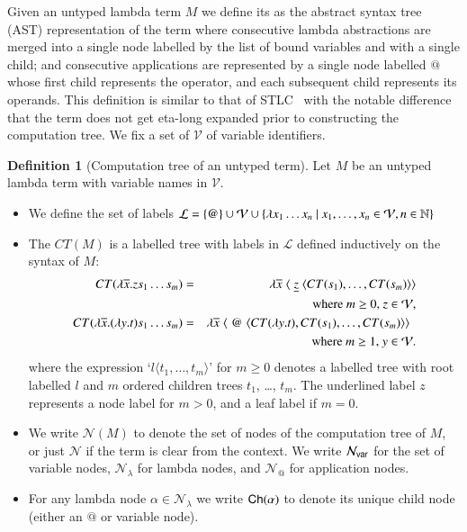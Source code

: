 \documentclass{elsarticle}
\makeatletter
\theoremstyle{plain}
\theoremstyle{definition}
\newtheorem{definition}{Definition}[section]
\theoremstyle{remark}
\newcommand\VarSet{\mathcal{V}}
\newcommand\Nodes{\mathcal{N}}%
\newcommand\NodesVar{\Nodes_{\sf var}}%
\newcommand\NodesLmd{\Nodes_\lambda}%
\newcommand\NodesApp{\Nodes_@}%
\newcommand{\child}{{\small \sf Ch}} %
\newcommand{\ctree}{CT} %
\makeatother
\begin{document}
Given an untyped lambda term $M$ we define its  as the abstract syntax tree (AST) representation of the term where consecutive lambda abstractions are merged into a single node labelled by the list of bound variables and with a single child; and consecutive applications are represented by a single node labelled $@$ whose first child represents the operator, and each subsequent child represents its operands.
This definition is similar to that of STLC~\cite{Ong2006, BlumPhd} with the notable difference that the term does not get eta-long expanded prior to constructing the computation tree.
We fix a set of $\VarSet$ of variable identifiers.
\begin{definition}[Computation tree of an untyped term]
Let $M$ be an untyped lambda term with variable names in $\VarSet$.
\begin{itemize}
\item We define the set of labels
$\mathcal{L} = \{ @ \} \union \VarSet \union \{ \lambda x_1 \ldots x_n \ | \ x_1 ,\ldots, x_n \in
    \VarSet, n\in\nat \}$
\item
    The  $\ctree(M)$ is a labelled tree with labels in $\mathcal{L}$
    defined inductively on the syntax of $M$:
    \begin{eqnarray*}
        \ctree(\lambda \overline{x} . z s_1 \ldots s_m) &=& \lambda \overline{x}\; \langle\; \underline z\; \langle \ctree(s_1),\ldots,\ctree(s_m)\rangle\rangle\\
        && \hbox {where $m\geq 0$, $z \in \VarSet$}, \\
 \ctree(\lambda \overline{x} . (\lambda y.t) s_1 \ldots s_m) &=& \lambda \overline{x}\; \langle\; @ \; \langle \ctree(\lambda y.t),\ctree(s_1),\ldots,\ctree(s_m) \rangle \rangle \enspace\\
&&  \hbox{where $m\geq 1$, $y\in \VarSet$}.
    \end{eqnarray*}
where the expression `$l\langle t_1, \ldots, t_m \rangle$' for $m \geq 0$ denotes a labelled tree with root labelled $l$ and $m$ ordered children trees $t_1$, \ldots, $t_m$. The underlined label $z$ represents a node label for $m>0$, and a leaf label if $m=0$.

\item We write $\Nodes(M)$ to denote the set of nodes of the computation tree of $M$, or just $\Nodes$ if the term is clear from the context. We write $\NodesVar$ for the set of variable nodes, $\NodesLmd$ for lambda nodes, and $\NodesApp$ for  application nodes.

\item For any lambda node $\alpha\in\NodesLmd$ we write $\child(\alpha)$ to denote its unique child node (either an $@$ or variable node).
\end{itemize}
\end{definition}
\end{document}
